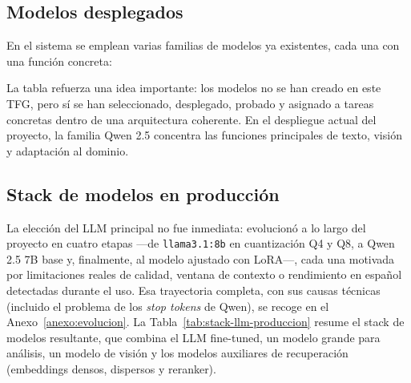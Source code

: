 \subsection{Modelos desplegados}

En el sistema se emplean varias familias de modelos ya existentes, cada una con una función concreta:

\begin{table}[H]
\centering
\caption{Modelos de IA desplegados en Ollama y su función en el sistema.}
\label{tab:modelos-ollama}
\end{table}

La tabla refuerza una idea importante: los modelos no se han creado en este TFG, pero sí se han seleccionado, desplegado, probado y asignado a tareas concretas dentro de una arquitectura coherente. En el despliegue actual del proyecto, la familia Qwen 2.5 concentra las funciones principales de texto, visión y adaptación al dominio.

\subsection{Stack de modelos en producción}
\label{subsec:stack-modelos}

La elección del LLM principal no fue inmediata: evolucionó a lo largo del proyecto en cuatro etapas ---de \texttt{llama3.1:8b} en cuantización Q4 y Q8, a Qwen 2.5 7B base y, finalmente, al modelo ajustado con LoRA---, cada una motivada por limitaciones reales de calidad, ventana de contexto o rendimiento en español detectadas durante el uso. Esa trayectoria completa, con sus causas técnicas (incluido el problema de los \textit{stop tokens} de Qwen), se recoge en el Anexo~\ref{anexo:evolucion}. La Tabla~\ref{tab:stack-llm-produccion} resume el stack de modelos resultante, que combina el LLM fine-tuned, un modelo grande para análisis, un modelo de visión y los modelos auxiliares de recuperación (embeddings densos, dispersos y reranker).

